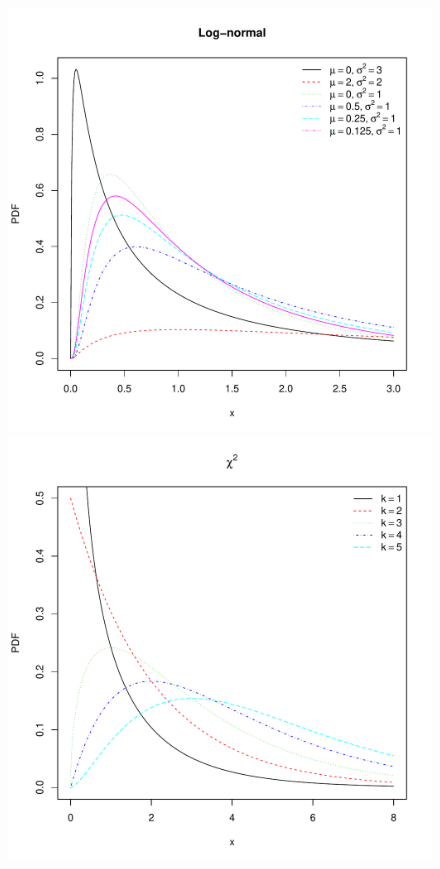 \documentclass[landscape]{article}
\begin{document}
\begin{figure}[H]
  \includegraphics[scale=0.35]{figs/lognormal.pdf}
  \includegraphics[scale=0.35]{figs/chisquare.pdf}

\end{figure}
\end{document}
